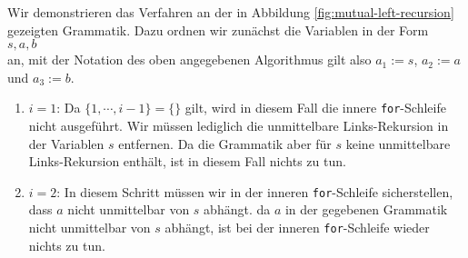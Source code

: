 \example
Wir demonstrieren das Verfahren an der in Abbildung \ref{fig:mutual-left-recursion} gezeigten
Grammatik.  Dazu ordnen wir zun\"achst die Variablen in der Form
\\[0.2cm]
\hspace*{1.3cm}
$s, a, b$
\\[0.2cm]
an, mit der Notation des oben angegebenen Algorithmus gilt also $a_1 := s$, $a_2 := a$ und 
$a_3 := b$.
\begin{enumerate}
\item $i = 1$:  Da $\{1, \cdots, i-1 \} = \{\}$ gilt,  wird in diesem Fall die innere
      \texttt{for}-Schleife nicht ausgef\"uhrt.  Wir m\"ussen lediglich
      die unmittelbare Links-Rekursion in der Variablen $s$ entfernen.  Da die Grammatik aber f\"ur
      $s$ keine unmittelbare Links-Rekursion enth\"alt, ist in diesem Fall nichts zu tun.
\item $i = 2$:  In diesem Schritt m\"ussen wir in der inneren \texttt{for}-Schleife sicherstellen,
      dass $a$ nicht unmittelbar von $s$ abh\"angt.  da $a$ in der gegebenen Grammatik nicht
      unmittelbar von $s$ abh\"angt, ist bei der inneren \texttt{for}-Schleife wieder nichts zu tun.


\end{enumerate}
